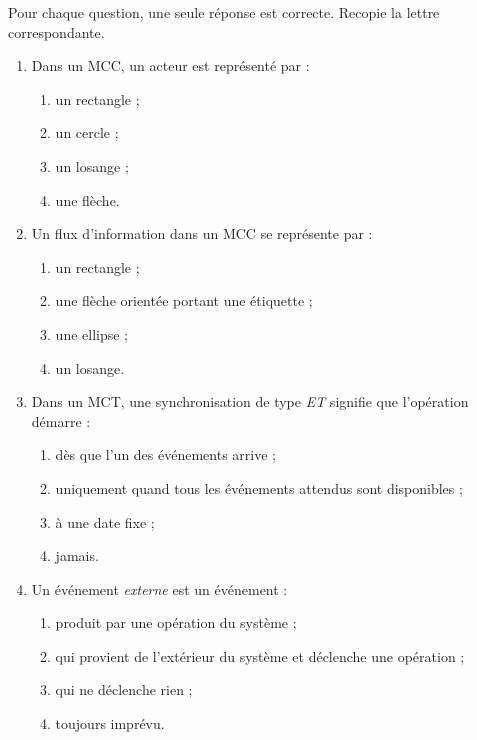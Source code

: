 \documentclass[11pt]{article}
\begin{document}
\begin{exercice}
Pour chaque question, une seule réponse est correcte. Recopie la lettre correspondante.
\begin{enumerate}
\item Dans un MCC, un acteur est représenté par :
\begin{enumerate}
\item un rectangle ; \item un cercle ; \item un losange ; \item une flèche.
\end{enumerate}
\item Un flux d'information dans un MCC se représente par :
\begin{enumerate}
\item un rectangle ; \item une flèche orientée portant une étiquette ; \item une ellipse ; \item un losange.
\end{enumerate}
\item Dans un MCT, une synchronisation de type \emph{ET} signifie que l'opération démarre :
\begin{enumerate}
\item dès que l'un des événements arrive ; \item uniquement quand tous les événements attendus sont disponibles ; \item à une date fixe ; \item jamais.
\end{enumerate}
\item Un événement \emph{externe} est un événement :
\begin{enumerate}
\item produit par une opération du système ; \item qui provient de l'extérieur du système et déclenche une opération ; \item qui ne déclenche rien ; \item toujours imprévu.
\end{enumerate}
\end{enumerate}
\end{exercice}
\end{document}
